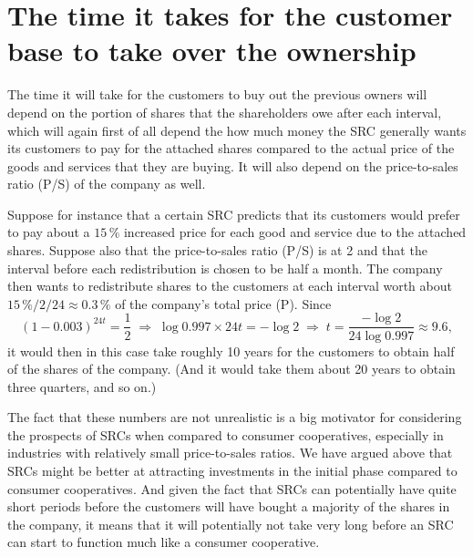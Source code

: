 \documentclass{article}
\begin{document}
\section{The time it takes for the customer base to take over the ownership}

The time it will take for the customers to buy out the previous owners will depend on the portion of shares that the shareholders owe after each interval, which will again first of all depend the how much money the SRC generally wants its customers to pay for the attached shares compared to the actual price of the goods and services that they are buying. It will also depend on the price-to-sales ratio (P/S) of the company as well. 

Suppose for instance that a certain SRC predicts that its customers would prefer to pay about a $15\, \%$ increased price for each good and service due to the attached shares. Suppose also that the price-to-sales ratio (P/S) is at 2 and that the interval before each redistribution is chosen to be half a month. The company then wants to redistribute shares to the customers at each interval worth about $15\, \% / 2 / 24 \approx 0.3\, \%$ of the company's total price (P).
Since
\[
	(1 - 0.003)^{24 t} = \frac{1}{2} 
	\;\Rightarrow\; 
	\log 0.997 \times 24 t = -\log 2 
	\;\Rightarrow\; 
	t = \frac{-\log 2}{24 \log 0.997} \approx 9.6,
\]
it would then in this case take roughly 10 years for the customers to obtain half of the shares of the company. (And it would take them about 20 years to obtain three quarters, and so on.)

The fact that these numbers are not unrealistic is a big motivator for considering the prospects of SRCs when compared to consumer cooperatives, especially in industries with relatively small price-to-sales ratios. We have argued above that SRCs might be better at attracting investments in the initial phase compared to consumer cooperatives. And given the fact that SRCs can potentially have quite short periods before the customers will have bought a majority of the shares in the company, it means that it will potentially not take very long before an SRC can start to function much like a consumer cooperative. 
\end{document}
